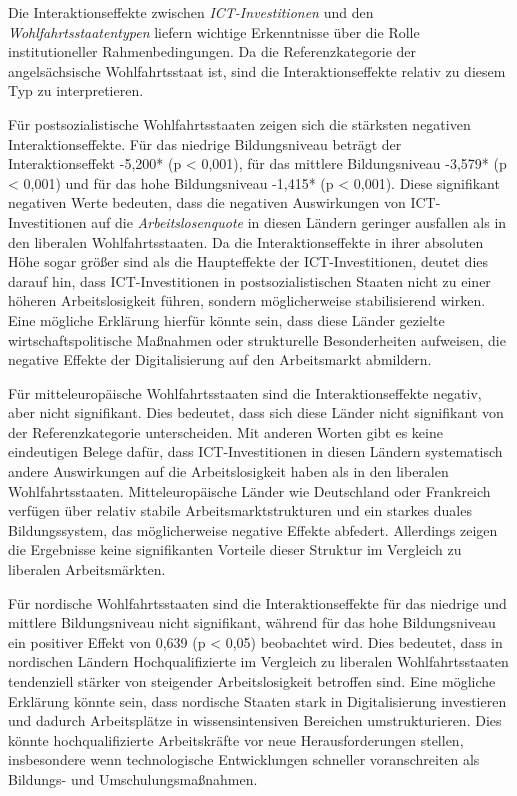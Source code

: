 Die Interaktionseffekte zwischen \textit{\ac{ICT}-Investitionen} und den \textit{Wohlfahrtsstaatentypen} liefern 
wichtige Erkenntnisse über die Rolle institutioneller Rahmenbedingungen. Da die Referenzkategorie der 
angelsächsische Wohlfahrtsstaat ist, sind die Interaktionseffekte relativ zu diesem Typ zu interpretieren.

Für postsozialistische Wohlfahrtsstaaten zeigen sich die stärksten negativen Interaktionseffekte. Für 
das niedrige Bildungsniveau beträgt der Interaktionseffekt -5,200* (p < 0,001), für das mittlere 
Bildungsniveau -3,579* (p < 0,001) und für das hohe Bildungsniveau -1,415* (p < 0,001). Diese signifikant 
negativen Werte bedeuten, dass die negativen Auswirkungen von \ac{ICT}-Investitionen auf die \textit{Arbeitslosenquote} 
in diesen Ländern geringer ausfallen als in den liberalen Wohlfahrtsstaaten. Da die Interaktionseffekte 
in ihrer absoluten Höhe sogar größer sind als die Haupteffekte der \ac{ICT}-Investitionen, deutet dies darauf 
hin, dass \ac{ICT}-Investitionen in postsozialistischen Staaten nicht zu einer höheren Arbeitslosigkeit 
führen, sondern möglicherweise stabilisierend wirken. Eine mögliche Erklärung hierfür könnte sein, dass 
diese Länder gezielte wirtschaftspolitische Maßnahmen oder strukturelle Besonderheiten aufweisen, die 
negative Effekte der Digitalisierung auf den Arbeitsmarkt abmildern.

Für mitteleuropäische Wohlfahrtsstaaten sind die Interaktionseffekte negativ, aber nicht signifikant. 
Dies bedeutet, dass sich diese Länder nicht signifikant von der Referenzkategorie unterscheiden. Mit 
anderen Worten gibt es keine eindeutigen Belege dafür, dass \ac{ICT}-Investitionen in diesen Ländern 
systematisch andere Auswirkungen auf die Arbeitslosigkeit haben als in den liberalen Wohlfahrtsstaaten. 
Mitteleuropäische Länder wie Deutschland oder Frankreich verfügen über relativ stabile 
Arbeitsmarktstrukturen und ein starkes duales Bildungssystem, das möglicherweise negative Effekte abfedert. 
Allerdings zeigen die Ergebnisse keine signifikanten Vorteile dieser Struktur im Vergleich zu liberalen 
Arbeitsmärkten.

Für nordische Wohlfahrtsstaaten sind die Interaktionseffekte für das niedrige und mittlere Bildungsniveau 
nicht signifikant, während für das hohe Bildungsniveau ein positiver Effekt von 0,639 (p < 0,05) beobachtet 
wird. Dies bedeutet, dass in nordischen Ländern Hochqualifizierte im Vergleich zu liberalen Wohlfahrtsstaaten 
tendenziell stärker von steigender Arbeitslosigkeit betroffen sind. Eine mögliche Erklärung könnte sein, 
dass nordische Staaten stark in Digitalisierung investieren und dadurch Arbeitsplätze in wissensintensiven 
Bereichen umstrukturieren. Dies könnte hochqualifizierte Arbeitskräfte vor neue Herausforderungen stellen, 
insbesondere wenn technologische Entwicklungen schneller voranschreiten als Bildungs- und Umschulungsmaßnahmen.

